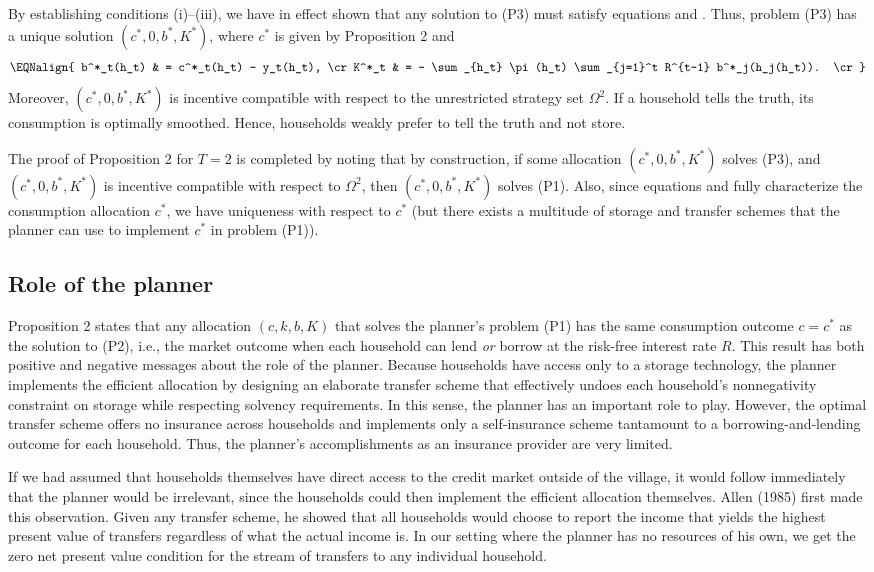 
By establishing conditions (i)--(iii), we have
in effect shown that any solution to (P3)
must satisfy equations  and . Thus, problem
(P3) has a unique solution $(c^*,0,b^*,K^*)$, where $c^*$ is given by
Proposition 2 and
$$\EQNalign{
 b^*_t(h_t) & = c^*_t(h_t) - y_t(h_t),  \cr
 K^*_t & = - \sum_{h_t} \pi(h_t) \sum_{j=1}^t R^{t-1} b^*_j(h_j(h_t)). \cr}
$$
Moreover, $(c^*,0,b^*,K^*)$
is incentive compatible with respect to the unrestricted strategy set
$\Omega^2$. If a household tells the truth, its consumption is optimally
smoothed. Hence, households weakly prefer to tell the truth and not store.

The proof of Proposition 2 for $T=2$ is  completed by noting that by
construction, if some allocation $(c^*,0,b^*,K^*)$
solves
(P3), and $(c^*,0,b^*,K^*)$ is incentive compatible with respect to
$\Omega^2$, then $(c^*,0,b^*,K^*)$ solves (P1). Also, since
equations  and  fully characterize the
consumption allocation $c^*$, we have uniqueness with
respect to $c^*$ (but there exists a multitude of storage and
transfer schemes that the planner can use to implement $c^*$ in problem (P1)).


\subsection{Role of the planner}

Proposition 2 states that any allocation $(c,k,b,K)$ that solves
the planner's problem (P1) has the same consumption outcome $c=c^*$
as the solution to (P2), i.e., the market outcome when each household
can lend {\it or\/} borrow at the risk-free interest rate $R$.  This
result has both positive and negative messages about the role of the
planner.  Because households have access only to a storage technology,
the planner implements the efficient allocation by designing an elaborate
transfer scheme that effectively undoes each household's nonnegativity
constraint on storage while respecting solvency requirements.  In this
sense, the planner has an important role to play.  However, the optimal
transfer scheme offers no insurance across households and  implements only
a self-insurance scheme tantamount to a borrowing-and-lending
outcome for each household.  Thus, the planner's accomplishments as an
insurance provider are very limited.

If we had assumed that households themselves have direct access to the
credit market outside of the village, it would follow immediately that
the planner would be irrelevant, since the households could then
implement the efficient allocation themselves. Allen (1985)  first made this observation.
 Given any transfer scheme, he showed that
all households would choose to report the income that yields the highest
present value of transfers regardless of what the actual income is. In our
setting where the planner has no resources of his own, we get the zero
net present value condition for the stream of transfers to any
individual household.


